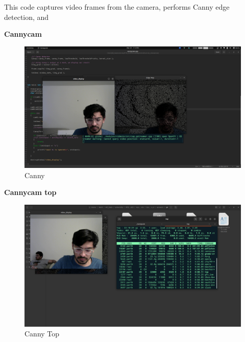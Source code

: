 \documentclass[a4paper,11pt]{article}%
\newenvironment{qanda}{\setlength{\parindent}{0pt}}{\bigskip}
\begin{document}
\begin{qanda}
\begin{enumerate}
This code captures video frames from the camera, performs Canny edge detection, and

\textbf{Cannycam}
\begin{figure}[H]
	\centering
	\includegraphics[scale=0.25]{figures/canny.png}
	\caption{Canny}
\end{figure}
\textbf{Cannycam top}
\begin{figure}[H]
	\centering
	\includegraphics[scale=0.25]{figures/canny_htop.png}
	\caption{Canny Top}
\end{figure}


\end{enumerate}
\end{qanda}
\end{document}
